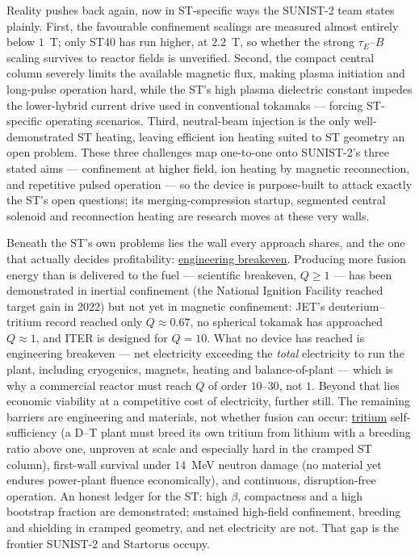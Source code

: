 \documentclass[11pt]{article}
\newcommand{\jl}[2]{\href{#2}{#1}}
\begin{document}
Reality pushes back again, now in ST-specific ways the SUNIST-2 team states plainly.\cite{tan_iaea} First, the favourable confinement scalings are measured almost entirely below $1$~T; only ST40 has run higher, at $2.2$~T, so whether the strong $\tau_E$--$B$ scaling survives to reactor fields is unverified.\cite{mcnamara2024} Second, the compact central column severely limits the available magnetic flux, making plasma initiation and long-pulse operation hard, while the ST's high plasma dielectric constant impedes the lower-hybrid current drive used in conventional tokamaks --- forcing ST-specific operating scenarios. Third, neutral-beam injection is the only well-demonstrated ST heating, leaving efficient ion heating suited to ST geometry an open problem. These three challenges map one-to-one onto SUNIST-2's three stated aims --- confinement at higher field, ion heating by magnetic reconnection, and repetitive pulsed operation --- so the device is purpose-built to attack exactly the ST's open questions; its merging-compression startup, segmented central solenoid and reconnection heating are research moves at these very walls.\cite{tan_iaea,cheng2022,li2025}

Beneath the ST's own problems lies the wall every approach shares, and the one that actually decides profitability: \jl{engineering breakeven}{https://en.wikipedia.org/wiki/Fusion_energy_gain_factor}. Producing more fusion energy than is delivered to the fuel --- scientific breakeven, $Q\ge1$ --- has been demonstrated in inertial confinement (the National Ignition Facility reached target gain in 2022) but not yet in magnetic confinement: JET's deuterium--tritium record reached only $Q\approx0.67$, no spherical tokamak has approached $Q\approx1$, and ITER is designed for $Q=10$.\cite{abushawareb2024,keilhacker1999,wurzel_hsu2022} What no device has reached is engineering breakeven --- net electricity exceeding the \emph{total} electricity to run the plant, including cryogenics, magnets, heating and balance-of-plant --- which is why a commercial reactor must reach $Q$ of order $10$--$30$, not $1$.\cite{wurzel_hsu2022,costley2019} Beyond that lies economic viability at a competitive cost of electricity, further still. The remaining barriers are engineering and materials, not whether fusion can occur: \jl{tritium}{https://en.wikipedia.org/wiki/Tritium} self-sufficiency (a D--T plant must breed its own tritium from lithium with a breeding ratio above one, unproven at scale and especially hard in the cramped ST column),\cite{abdou2006} first-wall survival under $14$~MeV neutron damage (no material yet endures power-plant fluence economically),\cite{zinkle_snead2014} and continuous, disruption-free operation.\cite{hender2007} An honest ledger for the ST: high $\beta$, compactness and a high bootstrap fraction are demonstrated; sustained high-field confinement, breeding and shielding in cramped geometry, and net electricity are not. That gap is the frontier SUNIST-2 and Startorus occupy.
\end{document}
